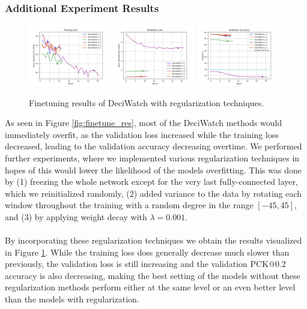 \documentclass[./main.tex]{subfiles}
\begin{document}
\subsubsection{Additional Experiment Results}
\label{sec:finetune_additional_experiment}
\begin{figure}
    \centering
    \includegraphics[width=0.32\textwidth]{./entities/finetuned/adapted/train_losses.png}
    \includegraphics[width=0.32\textwidth]{./entities/finetuned/adapted/val_losses.png}
    \includegraphics[width=0.32\textwidth]{./entities/finetuned/adapted/val_accs.png}
    \caption{Finetuning results of DeciWatch with regularization techniques.}
    \label{fig:finetune_res_2}
\end{figure}
As seen in Figure \ref{fig:finetune_res}, most of the DeciWatch methods would immediately overfit, as the validation loss increased while the training loss decreased, leading to the validation accuracy decreasing overtime. We performed further experiments, where we implemented various regularization techniques in hopes of this would lower the likelihood of the models overfitting. This was done by (1) freezing the whole network except for the very last fully-connected layer, which we reinitialized randomly, (2) added variance to the data by rotating each window throughout the training with a random degree in the range $[-45, 45]$, and (3) by applying weight decay with $\lambda = 0.001$.
\\
\\
By incorporating these regularization techniques we obtain the results visualized in Figure \ref{fig:finetune_res_2}. While the training loss doss generally decrease much slower than previously, the validation loss is still increasing and the validation PCK@0.2 accuracy is also decreasing, making the best setting of the models without these regularization methods perform either at the same level or an even better level than the models with regularization.
\end{document}
